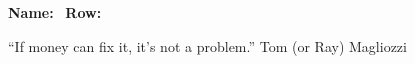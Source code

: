 \documentclass[12pt,fleqn]{exam}
\begin{document}
\newcommand{\reals}{\mathbf{R}}
\newcommand{\bi}{\mathbf{i}}
\newcommand{\bj}{\mathbf{j}}
\newcommand{\bk}{mathbf{k}}

\newcommand{\euler}{\mathrm{e}}
\newcommand{\ex}{1}
\newenvironment{alphalist}{
  \begin{enumerate}[(a)]
    \addtolength{\itemsep}{-1.0\itemsep}}
  {\end{enumerate}}

\newenvironment{handlist}{
  \begin{enumerate}[\leftthumbsup]
    \addtolength{\itemsep}{-1.0\itemsep}}
  {\end{enumerate}}

\large
\vspace{0.1in}
\noindent{}
{\bf Name:}\hrulefill\
\noindent {}
{\bf Row:}\hrulefill\

“If money can fix it, it’s not a problem.”  \hfill  {Tom (or Ray) Magliozzi}
\normalsize
\end{document}
